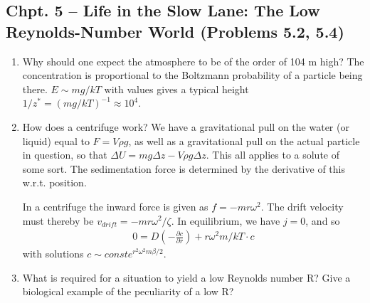 \documentclass[a4paper,12pt]{article}
\begin{document}
      \subsection{Chpt. 5 – Life in the Slow Lane: The Low Reynolds-Number World (Problems 5.2, 5.4)}
         \begin{enumerate}
            \item Why should one expect the atmosphere to be of the order of 104 m high?
               The concentration is proportional to the Boltzmann probability of
               a particle being there. $E \sim mg/kT$ with values gives a
               typical height $1/z^{*} = (mg/kT)^{-1} \approx 10^4$.
            \item How does a centrifuge work?
               We have a gravitational pull on the water (or liquid) equal to
               $F = V\rho g$, as well as a gravitational pull on the actual
               particle in question, so that $\Delta U = mg \Delta z - V\rho
               g\Delta z$. This all applies to a solute of some sort. 
               The sedimentation force is determined by the derivative of this
               w.r.t. position. 

               In a centrifuge the inward force is given as $f = -mr\omega^2$.
               The drift velocity must thereby be $v_{drift} = -mr\omega^2 /
               \zeta$. In equilibrium, we have $j = 0$, and so
               \begin{align*}
                  0 = D(-\frac{\partial c}{\partial r}) + r\omega^2m/kT \cdot c
               \end{align*}
               with solutions $c \sim const e^{r^2\omega^2m\beta/2}$.


            \item What is required for a situation to yield a low Reynolds number R? Give a biological
               example of the peculiarity of a low R?
         \end{enumerate}
\end{document}
